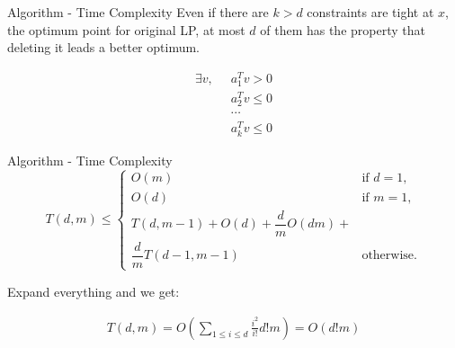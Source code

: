 \documentclass{beamer}
\begin{document}
\begin{frame}{Algorithm - Time Complexity}
    Even if there are $k > d$ constraints are tight at $x$, the optimum point for original LP, at most $d$ of them 
    has the property that deleting it leads a better optimum.

    
    \vspace{\baselineskip}
    
    \begin{align*}
        \exists v, \;\; &a_1^Tv > 0 \\
                   &a_2^Tv \le 0 \\ 
                   &\cdots \\
                   &a_k^Tv \le 0
    \end{align*}
\end{frame}
\begin{frame}{Algorithm - Time Complexity}
	\[
		T(d, m) \le
		\begin{cases}
			O(m)                         & \text{if } d = 1, \\
			O(d)                         & \text{if } m = 1, \\
			T(d, m - 1) + O(d) + \dfrac{d}{m} O(dm) +        \\
			\dfrac{d}{m} T(d - 1, m - 1) & \text{otherwise}.
		\end{cases}
	\]

	Expand everything and we get:

	\begin{align*}
		T(d, m) = O(\sum_{1\le i \le d} \frac{i^2}{i!} d! m) = O(d! m)
	\end{align*}

\end{frame}
\end{document}
